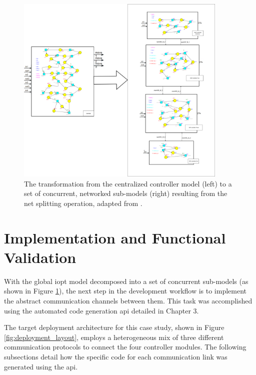 \begin{figure}[htb]
    \centering
    \includegraphics[width=0.9\textwidth]{Chapters/Figures/controller_decomposition.png}
\caption{The transformation from the centralized controller model (left) to a set of concurrent, networked sub-models (right) resulting from the net splitting operation, adapted from \cite{tavaresgomes2026}.}
    \label{fig:decomposed_model}
\end{figure}


\section{Implementation and Functional Validation}
\label{sec:use_case_implementation}

With the global \gls{iopt} model decomposed into a set of concurrent sub-models (as shown in Figure \ref{fig:decomposed_model}), the next step in the development workflow is to implement the abstract communication channels between them. This task was accomplished using the automated code generation \gls{api} detailed in Chapter 3.

The target deployment architecture for this case study, shown in Figure \ref{fig:deployment_layout}, employs a heterogeneous mix of three different communication protocols to connect the four controller modules. The following subsections detail how the specific code for each communication link was generated using the \gls{api}.

